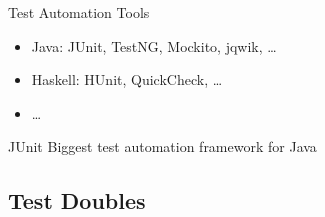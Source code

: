 \begin{frame}{\insertsubsection}
\begin{fancycolumns}[animation=none, b]
		\begin{definition}{Test Automation Tools}
			\begin{itemize}
				\item Java: JUnit, TestNG, Mockito, jqwik, \dots
				\item Haskell: HUnit, QuickCheck, \dots
				\item \dots
			\end{itemize}
		\end{definition} \pause
		\begin{note}{JUnit}
			Biggest test automation framework for Java		
		\end{note}
	\end{fancycolumns}
\end{frame}

\subsection{Test Doubles}
